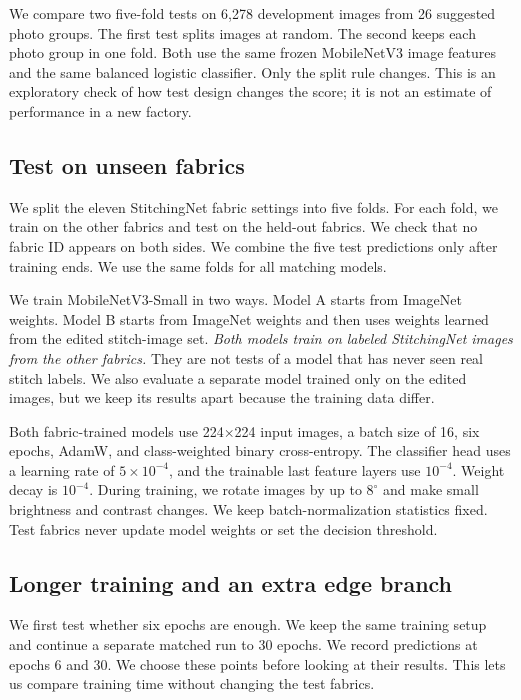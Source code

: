 \documentclass[conference,a4paper]{IEEEtran}
\begin{document}
We compare two five-fold tests on 6,278 development images from 26 suggested photo groups. The first test splits images at random. The second keeps each photo group in one fold. Both use the same frozen MobileNetV3 image features and the same balanced logistic classifier. Only the split rule changes. This is an exploratory check of how test design changes the score; it is not an estimate of performance in a new factory.

\subsection{Test on unseen fabrics}
We split the eleven StitchingNet fabric settings into five folds. For each fold, we train on the other fabrics and test on the held-out fabrics. We check that no fabric ID appears on both sides. We combine the five test predictions only after training ends. We use the same folds for all matching models.

We train MobileNetV3-Small in two ways. Model A starts from ImageNet weights. Model B starts from ImageNet weights and then uses weights learned from the edited stitch-image set. \emph{Both models train on labeled StitchingNet images from the other fabrics.} They are not tests of a model that has never seen real stitch labels. We also evaluate a separate model trained only on the edited images, but we keep its results apart because the training data differ.

Both fabric-trained models use 224$\times$224 input images, a batch size of 16, six epochs, AdamW, and class-weighted binary cross-entropy. The classifier head uses a learning rate of $5\times10^{-4}$, and the trainable last feature layers use $10^{-4}$. Weight decay is $10^{-4}$. During training, we rotate images by up to $8^{\circ}$ and make small brightness and contrast changes. We keep batch-normalization statistics fixed. Test fabrics never update model weights or set the decision threshold.

\subsection{Longer training and an extra edge branch}
We first test whether six epochs are enough. We keep the same training setup and continue a separate matched run to 30 epochs. We record predictions at epochs 6 and 30. We choose these points before looking at their results. This lets us compare training time without changing the test fabrics.
\end{document}
